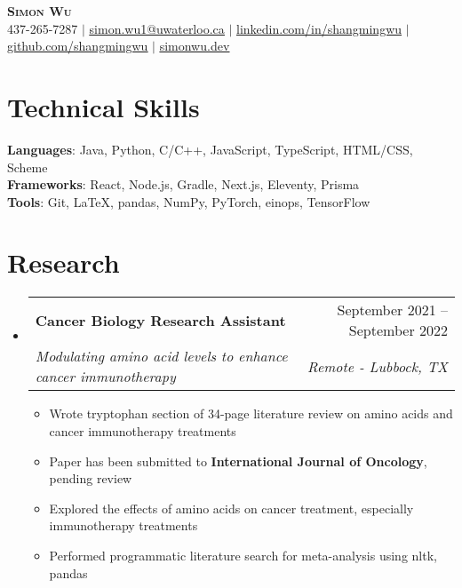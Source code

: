 \documentclass[letterpaper,11pt]{article}
\makeatletter
\newcommand{\resumeItem}[1]{
  \item\small{
    {#1 \vspace{-2pt}}
  }
}
\newcommand{\resumeSubheading}[4]{
  \vspace{-2pt}\item
    \begin{tabular*}{0.97\textwidth}[t]{l@{\extracolsep{\fill}}r}
      \textbf{#1} & #2 \\
      \textit{\small#3} & \textit{\small #4} \\
    \end{tabular*}\vspace{-7pt}
}
\newcommand{\resumeSubHeadingListStart}{\begin{itemize}[leftmargin=0.15in, label={}]}
\newcommand{\resumeSubHeadingListEnd}{\end{itemize}}
\newcommand{\resumeItemListStart}{\begin{itemize}}
\newcommand{\resumeItemListEnd}{\end{itemize}\vspace{-5pt}}
\makeatother
\begin{document}

\begin{center}
    \textbf{\Huge \scshape Simon Wu} \\ \vspace{1pt}
    \small 437-265-7287 $|$ \href{mailto:simon.wu1@uwaterloo.ca}{\underline{simon.wu1@uwaterloo.ca}} $|$ 
    \href{https://www.linkedin.com/in/simon-wu-53636a243}{\underline{linkedin.com/in/shangmingwu}} $|$
    \href{https://github.com/shangmingwu}{\underline{github.com/shangmingwu}} $|$
    \href{https://simonwu.dev}{\underline{simonwu.dev}}
\end{center}


\section{Technical Skills}
 \begin{itemize}[leftmargin=0.15in, label={}]
    \small{\item{
     \textbf{Languages}{: Java, Python, C/C++, JavaScript, TypeScript, HTML/CSS, Scheme } \\
     \textbf{Frameworks}{: React, Node.js, Gradle, Next.js, Eleventy, Prisma } \\
     \textbf{Tools}{: Git, \LaTeX, pandas, NumPy, PyTorch, einops, TensorFlow}
    }}
 \end{itemize}


\section{Research}
 \resumeSubHeadingListStart
  \resumeSubheading{Cancer Biology Research Assistant}{September 2021 -- September 2022}{Modulating amino acid levels to enhance cancer immunotherapy}{Remote - Lubbock, TX}
    \resumeItemListStart
        \resumeItem{Wrote tryptophan section of 34-page literature review on amino acids and cancer immunotherapy treatments}
        \resumeItem{Paper has been submitted to \textbf{International Journal of Oncology}, pending review}
        \resumeItem{Explored the effects of amino acids on cancer treatment, especially immunotherapy treatments}
        \resumeItem{Performed programmatic literature search for meta-analysis using nltk, pandas}
    \resumeItemListEnd
 \resumeSubHeadingListEnd
\end{document}
